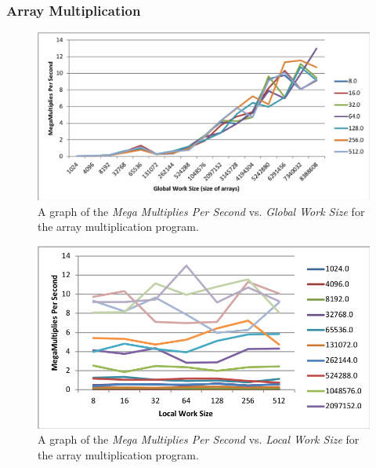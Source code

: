 \documentclass[onecolumn,draftclsnofoot, 10pt, compsoc]{IEEEtran}
\begin{document}
		\subsubsection{Array Multiplication}
			\begin{figure}[H]
				\includegraphics[width=16cm]{multMegasVsGlobal}
				\centering
				\caption{A graph of the \textit{Mega Multiplies Per Second} vs. \textit{Global Work Size} for the array multiplication program.}
			\end{figure}
				
			\begin{figure}[H]
				\includegraphics[width=16cm]{multMegasVsLocal}
				\centering
				\caption{A graph of the \textit{Mega Multiplies Per Second} vs. \textit{Local Work Size} for the array multiplication program.}
			\end{figure}
				
				
\end{document}
